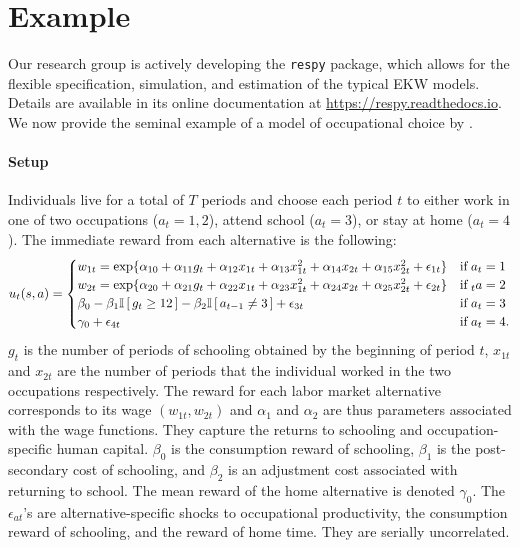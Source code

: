 \section{Example}\label{Example}
Our research group is actively developing the \verb+respy+ package, which allows for the flexible specification, simulation, and estimation of the typical EKW models. Details are available in its online documentation at \url{https://respy.readthedocs.io}. We now provide the seminal example of a model of occupational choice by \citet{Keane.1994}.

\paragraph{Setup} Individuals live for a total of $T$ periods and choose each period $t$ to either work in one of two occupations ($a_t = 1, 2$), attend school ($a_t = 3$), or stay at home ($a_t = 4$). The immediate reward from each alternative is the following:
%
\begin{align*}
u_t(s, a) = \begin{cases} w_{1t} =
\exp\{\alpha_{10} + \alpha_{11}g_t + \alpha_{12}x_{1t} + \alpha_{13}x^2_{1t} + \alpha_{14}x_{2t} + \alpha_{15}x^2_{2t} + \epsilon_{1t}\} & \text{if}\; a_t = 1 \\
w_{2t} = \exp\{\alpha_{20} + \alpha_{21}g_t + \alpha_{22}x_{1t} + \alpha_{23}x^2_{1t} + \alpha_{24}x_{2t} + \alpha_{25}x^2_{2t} + \epsilon_{2t}\}& \text{if}\;_t a = 2 \\
\beta_0 - \beta_1 \mathbb{I}\,[\,g_t \geq 12\,] - \beta_2\mathbb{I}\,[\,a_{t - 1} \neq 3\,] + \epsilon_{3t}& \text{if}\; a_t = 3 \\
\gamma_0 + \epsilon_{4t}& \text{if}\; a_t = 4. \\
\end{cases}
\end{align*}
%
$g_t$ is the number of periods of schooling obtained by the beginning of period $t$, $x_{1t}$ and $x_{2t}$ are the number of periods that the individual worked in the two occupations respectively. The reward for each labor market alternative corresponds to its wage $(w_{1t}, w_{2t})$ and $\alpha_{1}$ and $\alpha_{2}$ are thus parameters associated with the wage functions. They capture the returns to schooling and occupation-specific human capital. $\beta_0$ is the consumption reward of schooling, $\beta_1$ is the post-secondary cost of schooling, and $\beta_2$ is an adjustment cost associated with returning to school. The mean reward of the home alternative is denoted $\gamma_0$. The $\epsilon_{at}$'s are alternative-specific shocks to occupational productivity, the consumption reward of schooling, and the reward of home time. They are serially uncorrelated.\\

